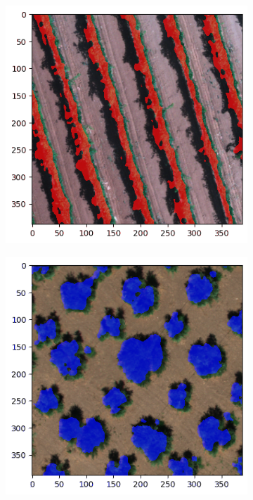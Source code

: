 \documentclass[comsoc,final]{IEEEtran}
\begin{document}
\begin{figure}
\begin{subfigure}[b]{0.45\columnwidth}
     \end{subfigure}%
% 
      \begin{subfigure}[b]{0.45\columnwidth}
         \centering \includegraphics[width=\columnwidth]{VITE1INF}
     \end{subfigure}
%
      \begin{subfigure}[b]{0.45\columnwidth}
         \centering \includegraphics[width=\columnwidth]{ULIVO2INF}

\end{subfigure}
\end{figure}
\end{document}
